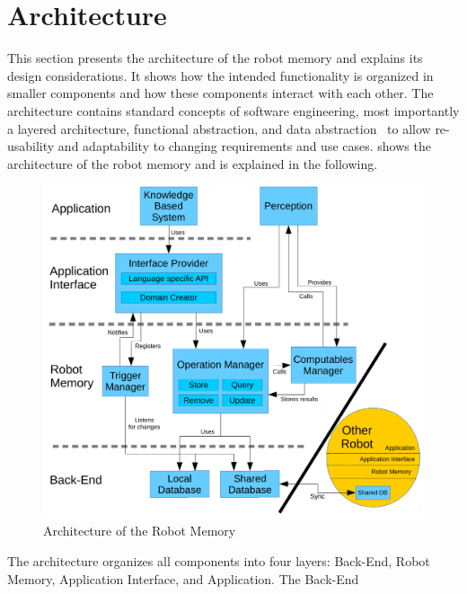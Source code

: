 \section{Architecture}
\label{sec:architecture}
This section presents the architecture of the robot memory and
explains its design considerations. It shows how the intended
functionality is organized in smaller components and how these
components interact with each other. The architecture contains
standard concepts of software engineering, most importantly a layered
architecture, functional abstraction, and data
abstraction~\cite{software-architecture} to allow
re-usability and adaptability to changing requirements and use cases.
 shows the architecture of the robot
memory and is explained in the following.
\begin{figure}
  \centering
  \includegraphics[width=1.1\textwidth]{architecture.pdf}
  \vspace{-5mm}
  \caption[Architecture of the Robot Memory]{Architecture of the Robot Memory}
  \label{fig:arch}
  \vspace{-5mm}
\end{figure}
The architecture organizes all components into four layers: Back-End,
Robot Memory, Application Interface, and Application. The Back-End
